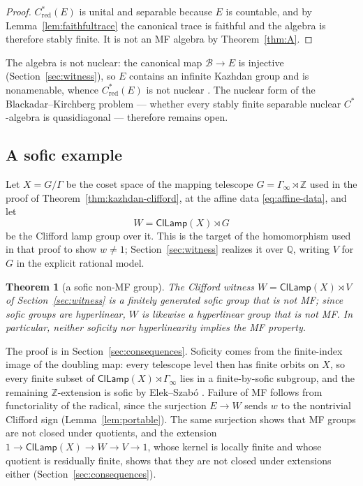 \documentclass[11pt]{amsart}
\newcommand{\leanverified}[2]{\ignorespaces}
\theoremstyle{definition}
\theoremstyle{remark}
\theoremstyle{plain}
\newtheorem{mainthm}{Theorem}
\newcommand{\Z}{\mathbb Z}
\newcommand{\ClLamp}{\mathsf{ClLamp}}
\newcommand{\Cred}{C^*_{\mathrm{red}}}
\begin{document}
\begin{proof}
$\Cred(E)$ is unital and separable because $E$ is countable, and by
Lemma~\ref{lem:faithfultrace} the canonical trace is faithful and the
algebra is therefore stably finite.  It is not an MF algebra by
Theorem~\ref{thm:A}.
\end{proof}

The algebra is not nuclear: the canonical map
$\mathcal B\to E$ is injective (Section~\ref{sec:witness}), so $E$
contains an infinite Kazhdan group and is nonamenable, whence
$\Cred(E)$ is not nuclear \cite{Lance}.  The nuclear form of the
Blackadar--Kirchberg problem --- whether every stably finite separable
nuclear $C^*$-algebra is quasidiagonal --- therefore remains open.

\subsection*{A sofic example}
Let $X=G/\Gamma$ be the coset space of the mapping telescope
$G=\Gamma_\infty\rtimes\Z$ used in the proof of
Theorem~\ref{thm:kazhdan-clifford}, at the affine data
\eqref{eq:affine-data}, and let
\[
 W=\ClLamp(X)\rtimes G
\]
be the Clifford lamp group over it.  This is the target of the
homomorphism used in that proof to show $w\ne1$;
Section~\ref{sec:witness} realizes it over $\mathbb Q$, writing $V$
for $G$ in the explicit rational model.

\begin{mainthm}[a sofic non-MF group]\label{thm:E}
The Clifford witness $W=\ClLamp(X)\rtimes V$ of
Section~\ref{sec:witness} is a finitely generated sofic group that
is not MF; since sofic groups are hyperlinear, $W$ is likewise a
hyperlinear group that is not MF\@.  In particular, neither soficity nor
hyperlinearity implies the MF property.
\leanverified{Endpoint/NonMFImpact}{GroupApproximation.NonMFImpact.witness_sofic_hyperlinear_nonMF}
\end{mainthm}

The proof is in Section~\ref{sec:consequences}.  Soficity comes from
the finite-index image of the doubling map: every telescope level then
has finite orbits on $X$, so every finite subset of
$\ClLamp(X)\rtimes\Gamma_\infty$ lies in a finite-by-sofic subgroup,
and the remaining $\Z$-extension is sofic by Elek--Szab\'o
\cite{ElekSzabo}.  Failure of MF follows from functoriality of the
radical, since the surjection $E\to W$ sends $w$ to the nontrivial
Clifford sign (Lemma~\ref{lem:portable}).  The same surjection shows that MF groups
are not closed under quotients, and the extension
$1\to\ClLamp(X)\to W\to V\to1$, whose kernel is locally finite and
whose quotient is residually finite, shows that they are not closed
under extensions either (Section~\ref{sec:consequences}).
\end{document}
